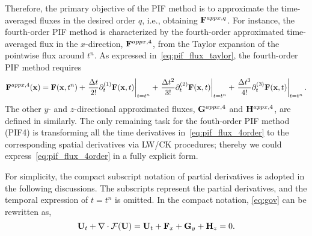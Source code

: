 Therefore, the primary objective of the PIF method is to approximate the time-averaged fluxes
in the desired order \( q \), i.e., obtaining \( \mathbf{F}^{appx, q} \).
For instance, the fourth-order PIF method is characterized by
the fourth-order approximated time-averaged flux in the \( x \)-direction, \( \mathbf{F}^{appx,4} \),
from the Taylor expansion of the pointwise flux around \( t^{n} \).
As expressed in~\cref{eq:pif_flux_taylor}, the fourth-order PIF method requires
\begin{equation}\label{eq:pif_flux_4order}
    \mathbf{F}^{appx, 4} (\mathbf{x}) = \mathbf{F} (\mathbf{x}, t^{n})
        + \left. \frac{\Delta t}{2!} \partial_{t}^{(1)} \mathbf{F} (\mathbf{x}, t) \right|_{t = t^{n}}
        + \left. \frac{\Delta t^{2}}{3!} \partial_{t}^{(2)} \mathbf{F} (\mathbf{x}, t) \right|_{t = t^{n}}
        + \left. \frac{\Delta t^{3}}{4!} \partial_{t}^{(3)} \mathbf{F} (\mathbf{x}, t) \right|_{t = t^{n}}.
\end{equation}
The other \( y \)- and \( z \)-directional approximated fluxes,
\( \mathbf{G}^{appx, 4} \) and \( \mathbf{H}^{appx, 4} \),
are defined in similarly.
The only remaining task for the fouth-order PIF method (PIF4) is transforming all the
time derivatives in~\cref{eq:pif_flux_4order} to the corresponding spatial derivatives
via LW/CK procedures;
thereby we could express~\cref{eq:pif_flux_4order} in a fully explicit form.

For simplicity, the compact subscript notation of partial derivatives is adopted
in the following discussions.
The subscripts represent the partial derivatives,
and the temporal expression of \( t = t^{n} \) is omitted.
In the compact notation, \cref{eq:gov} can be rewritten as,
\begin{equation}\label{eq:pif_gov_compact_notation}
    \mathbf{U}_{t} + \nabla \cdot \mathcal{F}(\mathbf{U}) = \mathbf{U}_{t} + \mathbf{F}_{x} + \mathbf{G}_{y} + \mathbf{H}_{z} = 0.
\end{equation}

